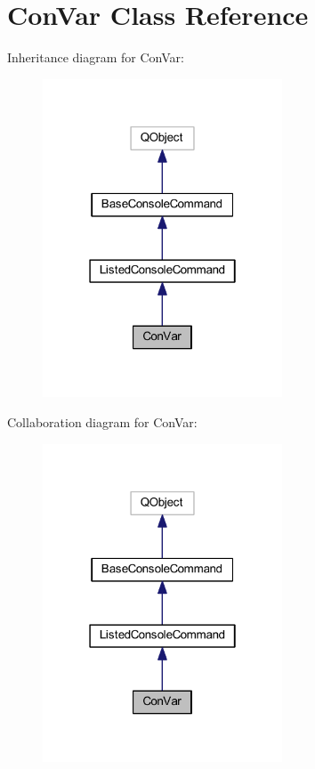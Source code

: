 \hypertarget{class_con_var}{\section{Con\-Var Class Reference}
\label{class_con_var}
}


Inheritance diagram for Con\-Var\-:\nopagebreak
\begin{figure}[H]
\begin{center}
\leavevmode
\includegraphics[width=202pt]{class_con_var__inherit__graph}
\end{center}
\end{figure}


Collaboration diagram for Con\-Var\-:\nopagebreak
\begin{figure}[H]
\begin{center}
\leavevmode
\includegraphics[width=202pt]{class_con_var__coll__graph}
\end{center}
\end{figure}
